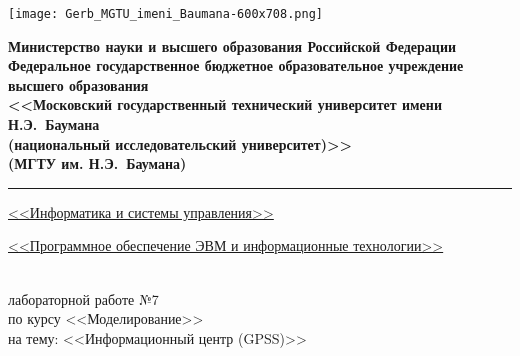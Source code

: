 \clearpage

\thispagestyle{fancy}
\renewcommand{\headrulewidth}{0pt}
\fancyhead{}

{
    \linespread{1}

    \noindent\begin{minipage}{0.12\textwidth}
        \texttt{[image: Gerb\_MGTU\_imeni\_Baumana-600x708.png]}
    \end{minipage}
    \hfill
    \noindent\begin{minipage}{0.83\textwidth}\centering
        \centering
        \small
        \bfseries
        Министерство науки и высшего образования Российской Федерации\\
        Федеральное государственное бюджетное образовательное учреждение высшего образования\\
        <<Московский государственный технический университет имени Н.Э.~Баумана\\
        (национальный исследовательский университет)>>\\
        (МГТУ им. Н.Э.~Баумана)
    \end{minipage}
}

\noindent\rule{\linewidth}{3pt}

{
\small
{} \uline{\hfill<<Информатика и системы управления>>\hfill}

 \uline{\hfill<<Программное обеспечение ЭВМ и информационные технологии>>\hfill}
}

\vspace{7\baselineskip}

\begin{center}
    {\Large{}} \\
    { лабораторной работе №7} \\
    по курсу <<Моделирование>> \\
    на тему: <<Информационный центр (GPSS)>> \\
\end{center}

\vspace{6\baselineskip}

